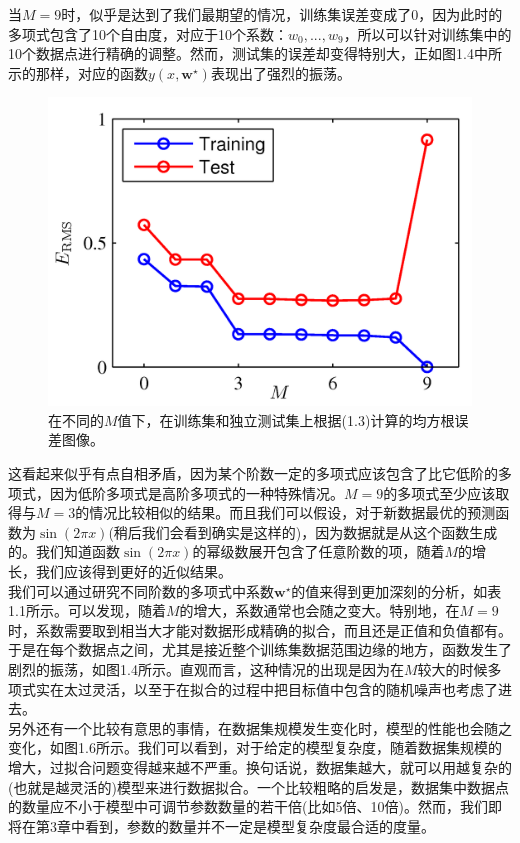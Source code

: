 \documentclass[b5paper]{book}
\numberwithin{equation}{chapter}
\begin{document}
{	\indent 当$M=9$时，似乎是达到了我们最期望的情况，训练集误差变成了$0$，因为此时的多项式包含了10个自由度，对应于10个系数：$w_0,...,w_9$，所以可以针对训练集中的10个数据点进行精确的调整。然而，测试集的误差却变得特别大，正如图1.4中所示的那样，对应的函数$y(x,\mathbf{w^\star})$表现出了强烈的振荡。
	\begin{figure}[H]
		\centering
		\includegraphics[scale=0.8]{Images/1-5.png}
		\caption{在不同的$M$值下，在训练集和独立测试集上根据(1.3)计算的均方根误差图像。} 
		\label{fig:1-5}	
	\end{figure}
	\indent 这看起来似乎有点自相矛盾，因为某个阶数一定的多项式应该包含了比它低阶的多项式，因为低阶多项式是高阶多项式的一种特殊情况。$M=9$的多项式至少应该取得与$M=3$的情况比较相似的结果。而且我们可以假设，对于新数据最优的预测函数为$\sin (2 \pi x)$(稍后我们会看到确实是这样的)，因为数据就是从这个函数生成的。我们知道函数$\sin (2 \pi x)$的幂级数展开包含了任意阶数的项，随着$M$的增长，我们应该得到更好的近似结果。\\
	\indent 我们可以通过研究不同阶数的多项式中系数$\mathbf{w^\star}$的值来得到更加深刻的分析，如表1.1所示。可以发现，随着$M$的增大，系数通常也会随之变大。特别地，在$M=9$时，系数需要取到相当大才能对数据形成精确的拟合，而且还是正值和负值都有。于是在每个数据点之间，尤其是接近整个训练集数据范围边缘的地方，函数发生了剧烈的振荡，如图1.4所示。直观而言，这种情况的出现是因为在$M$较大的时候多项式实在太过灵活，以至于在拟合的过程中把目标值中包含的随机噪声也考虑了进去。	\\
	\indent 另外还有一个比较有意思的事情，在数据集规模发生变化时，模型的性能也会随之变化，如图1.6所示。我们可以看到，对于给定的模型复杂度，随着数据集规模的增大，过拟合问题变得越来越不严重。换句话说，数据集越大，就可以用越复杂的(也就是越灵活的)模型来进行数据拟合。一个比较粗略的启发是，数据集中数据点的数量应不小于模型中可调节参数数量的若干倍(比如5倍、10倍)。然而，我们即将在第3章中看到，参数的数量并不一定是模型复杂度最合适的度量。\\
}
\end{document}
